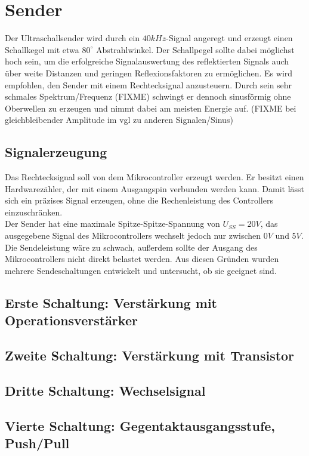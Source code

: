 


\chapter{Sender}
Der Ultraschallsender wird durch ein $40 kHz$-Signal angeregt und erzeugt einen Schallkegel mit etwa $80^\circ$ Abstrahlwinkel. Der Schallpegel sollte dabei möglichst hoch sein, um die erfolgreiche Signalauswertung des reflektierten Signals auch über weite Distanzen und geringen Reflexionsfaktoren zu ermöglichen. Es wird empfohlen, den Sender mit einem Rechtecksignal anzusteuern. Durch sein sehr schmales Spektrum/Frequenz (FIXME) schwingt er dennoch sinusförmig ohne Oberwellen zu erzeugen und nimmt dabei am meisten Energie auf. (FIXME bei gleichbleibender Amplitude im vgl zu anderen Signalen/Sinus)


\section{Signalerzeugung}
Das Rechtecksignal soll von dem Mikrocontroller erzeugt werden. Er besitzt einen Hardwarezähler, der mit einem Ausgangspin verbunden werden kann. Damit lässt sich ein präzises Signal erzeugen, ohne die Rechenleistung des Controllers einzuschränken.\\
Der Sender hat eine maximale Spitze-Spitze-Spannung von $U_{SS} = 20V$, das ausgegebene Signal des Mikrocontrollers wechselt jedoch nur zwischen $0V$ und $5V$. Die Sendeleistung wäre zu schwach, außerdem sollte der Ausgang des Mikrocontrollers nicht direkt belastet werden. Aus diesen Gründen wurden mehrere Sendeschaltungen entwickelt und untersucht, ob sie geeignet sind.



\section{Erste Schaltung: Verstärkung mit Operationsverstärker}


\section{Zweite Schaltung: Verstärkung mit Transistor}


\section{Dritte Schaltung: Wechselsignal}


\section{Vierte Schaltung: Gegentaktausgangsstufe, Push/Pull}




